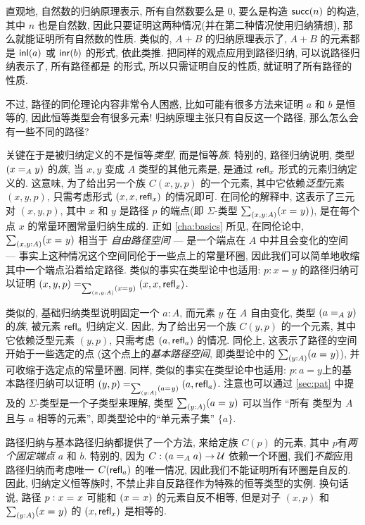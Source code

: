 \begin{rmk}
    \label{rmk:the-only-path-is-refl}
    直观地, 自然数的归纳原理表示, 所有自然数要么是 $0$, 要么是构造 $\suc(n)$ 的构造, 其中 $n$ 也是自然数, 因此只要证明这两种情况(并在第二种情况使用归纳猜想), 那么就能证明所有自然数的性质.
    类似的, $A+B$ 的归纳原理表示了, $A+B$ 的元素都是 $\inl(a)$ 或 $\inr(b)$ 的形式, 依此类推.
    把同样的观点应用到路径归纳, 可以说路径归纳表示了, 所有路径都是  的形式, 所以只需证明自反的性质, 就证明了所有路径的性质.

    不过, 路径的同伦理论内容非常令人困惑, 比如可能有很多方法来证明 $a$ 和 $b$ 是恒等的, 因此恒等类型会有很多元素!
    归纳原理主张只有自反这一个路径, 那么怎么会有一些不同的路径?

    关键在于是被归纳定义的不是恒等\emph{类型}, 而是恒等\emph{族}.
    特别的, 路径归纳说明, 类型 $(\id[A]{x}{y})$ 的\emph{族},  当 $x,y$ 变成 $A$ 类型的其他元素是, 是通过 $\refl{x}$ 形式的元素归纳定义的.
    这意味, 为了给出另一个族 $C(x,y,p)$ 的一个元素, 其中它依赖\emph{泛型}元素 $(x,y,p)$, 只需考虑形式 $(x,x,\refl{x})$ 的情况即可.
    在同伦的解释中, 这表示了三元对 $(x,y,p)$, 其中 $x$ 和 $y$ 是路径 $p$ 的端点(即 $\Sigma$-类型 $\sm{x,y:A}(\id{x}{y})$), 是在每个点 $x$ 的常量环圈常量归纳生成的.
    正如 \cref{cha:basics} 所见, 在同伦论中, $\sm{x,y:A}(\id{x}{y})$ 相当于 \emph{自由路径空间} --- 是一个端点在 $A$ 中并且会变化的空间 --- 事实上这种情况这个空间同伦于一些点上的常量环圈, 因此我们可以简单地收缩其中一个端点沿着给定路径.
    类似的事实在类型论中也适用: $p:x=y$ 的路径归纳可以证明 $\id[\sm{x,y:A}(\id{x}{y})]{(x,y,p)}{(x,x,\refl{x})}$.

    类似的, 基础归纳类型说明固定一个 $a:A$, 而元素 $y$ 在 $A$ 自由变化, 类型 $(\id[A]{a}{y})$ 的\emph{族}, 被元素 $\refl{a}$ 归纳定义.
    因此, 为了给出另一个族 $C(y,p)$ 的一个元素, 其中它依赖泛型元素 $(y,p)$, 只需考虑 $(a,\refl{a})$ 的情况.
    同伦上, 这表示了路径的空间开始于一些选定的点 (这个点上的\emph{基本路径空间}, 即类型论中的 $\sm{y:A} (\id{a}{y})$), 并可收缩于选定点的常量环圈.
    同样, 类似的事实在类型论中也适用: $p:a=y$上的基本路径归纳可以证明 $\id[\sm{y:A}(\id{a}{y})]{(y,p)}{(a,\refl{a})}$.
    注意也可以通过 \cref{sec:pat} 中提及的 $\Sigma$-类型是一个子类型来理解, 类型 $\sm{y:A}(\id{a}{y})$ 可以当作 ``所有 类型为 $A$ 且与 $a$ 相等的元素'', 即类型论中的``单元素子集'' $\{a\}$.

    路径归纳与基本路径归纳都提供了一个方法, 来给定族 $C(p)$ 的元素, 其中 $p$有\emph{两个固定端点} $a$ 和 $b$.
    特别的, 因为 $C: (\id[A]{a}{a}) \to \UU$ 依赖一个环圈, 我们\emph{不能}应用路径归纳而考虑唯一 $C(\refl{a})$ 的唯一情况, 因此我们不能证明所有环圈是自反的.
    因此, 归纳定义恒等族时, 不禁止非自反路径作为特殊的恒等类型的实例.
    换句话说, 路径 $p:\id{x}{x}$ 可能和 $(\id{x}{x})$ 的元素自反不相等, 但是对子 $(x,p)$ 和 $\sm{y:A}(\id{x}{y})$ 的 $(x,\refl{x})$ 是相等的.


\end{rmk}
